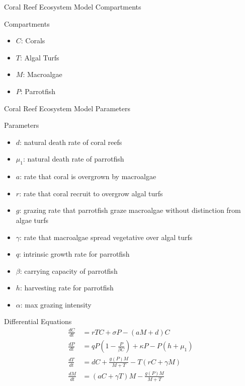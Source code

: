 \documentclass{beamer}
\begin{document}
\begin{frame}{Coral Reef Ecosystem Model Compartments}
    \begin{block}{Compartments }
        \begin{itemize}
        \item \small{$C$: Corals}
        \item \small{$T$: Algal Turfs}
        \item \small{$M$: Macroalgae}
        \item \small{$P$: Parrotfish}
        \end{itemize}
    \end{block}
\end{frame}

\begin{frame}{Coral Reef Ecosystem Model Parameters}
    \begin{block}{Parameters}
    \begin{itemize}
        \item $d$: natural death rate of coral reefs
        \item $\mu_{1}$: natural death rate of parrotfish
        \item $a$: rate that coral is overgrown by macroalgae
        \item $r$: rate that coral recruit to overgrow algal turfs
        \item $g$: grazing rate that parrotfish graze macroalgae without distinction from algae turfs
        \item $\gamma$: rate that macroalgae spread vegetative over algal turfs
        \item $q$: intrinsic growth rate for parrotfish
        \item $\beta$: carrying capacity of parrotfish
        \item $h$: harvesting rate for parrotfish
        \item $\alpha$: max grazing intensity
    \end{itemize}
    \end{block}
\end{frame}

\begin{frame}{Differential Equations}
    \begin{align*}
        \frac{dC}{dt} &= rTC + \sigma P- (aM+d)C\\
        \frac{dP}{dt} &= qP \left( 1-\frac{P}{\beta C} \right) + \kappa P - P \left( h+\mu_{1} \right)\\
        \frac{dT}{dt} &= dC + \frac{g(P)M}{M+T} - T(rC+\gamma M)\\
        \frac{dM}{dt} &= (aC+ \gamma T)M - \frac{g(P)M}{M+T}
    \end{align*}
\end{frame}
\end{document}
